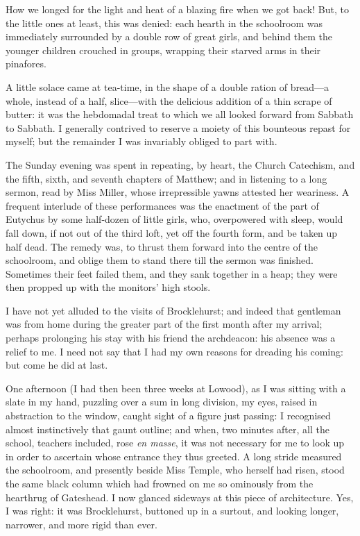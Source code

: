 How we longed for the light and heat of a blazing fire when we got
back! But, to the little ones at least, this was denied: each hearth in
the schoolroom was immediately surrounded by a double row of great
girls, and behind them the younger children crouched in groups, wrapping
their starved arms in their pinafores.

A little solace came at tea-time, in the shape of a double ration of
bread---a whole, instead of a half, slice---with the delicious addition
of a thin scrape of butter: it was the hebdomadal treat to which we all
looked forward from Sabbath to Sabbath. I generally contrived to
reserve a moiety of this bounteous repast for myself; but the remainder
I was invariably obliged to part with.

The Sunday evening was spent in repeating, by heart, the Church
Catechism, and the fifth, sixth, and seventh chapters of \St{} Matthew;
and in listening to a long sermon, read by Miss Miller, whose
irrepressible yawns attested her weariness. A frequent interlude of
these performances was the enactment of the part of Eutychus by some
half-dozen of little girls, who, overpowered with sleep, would fall
down, if not out of the third loft, yet off the fourth form, and be
taken up half dead. The remedy was, to thrust them forward into the
centre of the schoolroom, and oblige them to stand there till the sermon
was finished. Sometimes their feet failed them, and they sank together
in a heap; they were then propped up with the monitors' high stools.

I have not yet alluded to the visits of \Mr{} Brocklehurst; and indeed
that gentleman was from home during the greater part of the first month
after my arrival; perhaps prolonging his stay with his friend the
archdeacon: his absence was a relief to me. I need not say that I had
my own reasons for dreading his coming: but come he did at last.

One afternoon (I had then been three weeks at Lowood), as I was sitting
with a slate in my hand, puzzling over a sum in long division, my eyes,
raised in abstraction to the window, caught sight of a figure just
passing: I recognised almost instinctively that gaunt outline; and when,
two minutes after, all the school, teachers included, rose \emph{en
masse}, it was not necessary for me to look up in order to ascertain
whose entrance they thus greeted. A long stride measured the
schoolroom, and presently beside Miss Temple, who herself had risen,
stood the same black column which had frowned on me so ominously from
the hearthrug of Gateshead. I now glanced sideways at this piece of
architecture. Yes, I was right: it was \Mr{} Brocklehurst, buttoned up in
a surtout, and looking longer, narrower, and more rigid than ever.

